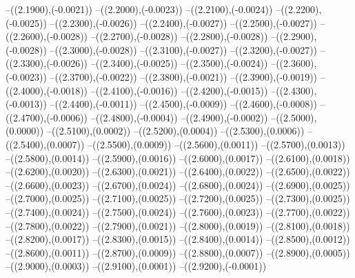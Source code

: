 {	--({\sx*(2.1900)},{\sy*(-0.0021)})
	--({\sx*(2.2000)},{\sy*(-0.0023)})
	--({\sx*(2.2100)},{\sy*(-0.0024)})
	--({\sx*(2.2200)},{\sy*(-0.0025)})
	--({\sx*(2.2300)},{\sy*(-0.0026)})
	--({\sx*(2.2400)},{\sy*(-0.0027)})
	--({\sx*(2.2500)},{\sy*(-0.0027)})
	--({\sx*(2.2600)},{\sy*(-0.0028)})
	--({\sx*(2.2700)},{\sy*(-0.0028)})
	--({\sx*(2.2800)},{\sy*(-0.0028)})
	--({\sx*(2.2900)},{\sy*(-0.0028)})
	--({\sx*(2.3000)},{\sy*(-0.0028)})
	--({\sx*(2.3100)},{\sy*(-0.0027)})
	--({\sx*(2.3200)},{\sy*(-0.0027)})
	--({\sx*(2.3300)},{\sy*(-0.0026)})
	--({\sx*(2.3400)},{\sy*(-0.0025)})
	--({\sx*(2.3500)},{\sy*(-0.0024)})
	--({\sx*(2.3600)},{\sy*(-0.0023)})
	--({\sx*(2.3700)},{\sy*(-0.0022)})
	--({\sx*(2.3800)},{\sy*(-0.0021)})
	--({\sx*(2.3900)},{\sy*(-0.0019)})
	--({\sx*(2.4000)},{\sy*(-0.0018)})
	--({\sx*(2.4100)},{\sy*(-0.0016)})
	--({\sx*(2.4200)},{\sy*(-0.0015)})
	--({\sx*(2.4300)},{\sy*(-0.0013)})
	--({\sx*(2.4400)},{\sy*(-0.0011)})
	--({\sx*(2.4500)},{\sy*(-0.0009)})
	--({\sx*(2.4600)},{\sy*(-0.0008)})
	--({\sx*(2.4700)},{\sy*(-0.0006)})
	--({\sx*(2.4800)},{\sy*(-0.0004)})
	--({\sx*(2.4900)},{\sy*(-0.0002)})
	--({\sx*(2.5000)},{\sy*(0.0000)})
	--({\sx*(2.5100)},{\sy*(0.0002)})
	--({\sx*(2.5200)},{\sy*(0.0004)})
	--({\sx*(2.5300)},{\sy*(0.0006)})
	--({\sx*(2.5400)},{\sy*(0.0007)})
	--({\sx*(2.5500)},{\sy*(0.0009)})
	--({\sx*(2.5600)},{\sy*(0.0011)})
	--({\sx*(2.5700)},{\sy*(0.0013)})
	--({\sx*(2.5800)},{\sy*(0.0014)})
	--({\sx*(2.5900)},{\sy*(0.0016)})
	--({\sx*(2.6000)},{\sy*(0.0017)})
	--({\sx*(2.6100)},{\sy*(0.0018)})
	--({\sx*(2.6200)},{\sy*(0.0020)})
	--({\sx*(2.6300)},{\sy*(0.0021)})
	--({\sx*(2.6400)},{\sy*(0.0022)})
	--({\sx*(2.6500)},{\sy*(0.0022)})
	--({\sx*(2.6600)},{\sy*(0.0023)})
	--({\sx*(2.6700)},{\sy*(0.0024)})
	--({\sx*(2.6800)},{\sy*(0.0024)})
	--({\sx*(2.6900)},{\sy*(0.0025)})
	--({\sx*(2.7000)},{\sy*(0.0025)})
	--({\sx*(2.7100)},{\sy*(0.0025)})
	--({\sx*(2.7200)},{\sy*(0.0025)})
	--({\sx*(2.7300)},{\sy*(0.0025)})
	--({\sx*(2.7400)},{\sy*(0.0024)})
	--({\sx*(2.7500)},{\sy*(0.0024)})
	--({\sx*(2.7600)},{\sy*(0.0023)})
	--({\sx*(2.7700)},{\sy*(0.0022)})
	--({\sx*(2.7800)},{\sy*(0.0022)})
	--({\sx*(2.7900)},{\sy*(0.0021)})
	--({\sx*(2.8000)},{\sy*(0.0019)})
	--({\sx*(2.8100)},{\sy*(0.0018)})
	--({\sx*(2.8200)},{\sy*(0.0017)})
	--({\sx*(2.8300)},{\sy*(0.0015)})
	--({\sx*(2.8400)},{\sy*(0.0014)})
	--({\sx*(2.8500)},{\sy*(0.0012)})
	--({\sx*(2.8600)},{\sy*(0.0011)})
	--({\sx*(2.8700)},{\sy*(0.0009)})
	--({\sx*(2.8800)},{\sy*(0.0007)})
	--({\sx*(2.8900)},{\sy*(0.0005)})
	--({\sx*(2.9000)},{\sy*(0.0003)})
	--({\sx*(2.9100)},{\sy*(0.0001)})
	--({\sx*(2.9200)},{\sy*(-0.0001)})
}
